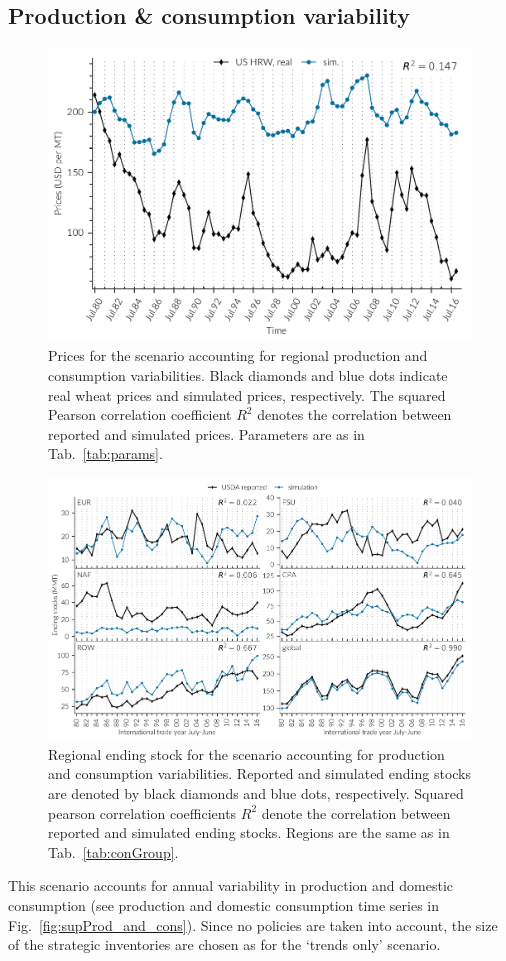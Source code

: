\subsection{Production \& consumption variability}
\begin{figure}[htbp]
  \centering
\includegraphics[width=.8\textwidth]{plots/baseline/pric1980_2017}
\caption{Prices for the scenario accounting for regional production and consumption
  variabilities. Black diamonds and blue dots indicate real wheat prices and simulated
  prices, respectively. The squared Pearson correlation coefficient $R^2$ denotes the correlation
  between reported and simulated prices. Parameters are as in Tab.~\ref{tab:params}.} %
  \label{fig:baseline}
\end{figure}
\begin{figure}[htbp]
  \centering \includegraphics[width=.8\textwidth]{plots/baseline/Ending_stocks__MMT__1980_2017}
  \caption{Regional ending stock for the scenario accounting for production and consumption
    variabilities. Reported and simulated ending stocks are denoted by black diamonds and blue dots,
    respectively. Squared pearson correlation coefficients $R^2$ denote the correlation between
    reported and simulated ending stocks. Regions are the same as in Tab.~\ref{tab:conGroup}.}
  \label{fig:stocks_baseline}
\end{figure}
This scenario accounts for annual variability in production and domestic consumption (see production
and domestic consumption time series in Fig.~\ref{fig:supProd_and_cons}). Since no policies are
taken into account, the size of the strategic inventories are chosen as for the `trends only'
scenario.

